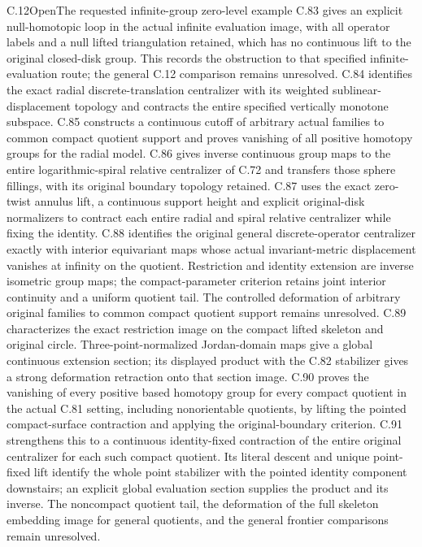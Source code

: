 \begin{claim}{C.12}{Open}{The requested infinite-group zero-level example}
C.83 gives an explicit null-homotopic loop in the actual infinite evaluation image, with all operator labels and a null lifted triangulation retained, which has no continuous lift to the original closed-disk group. This records the obstruction to that specified infinite-evaluation route; the general C.12 comparison remains unresolved.
C.84 identifies the exact radial discrete-translation centralizer with its weighted sublinear-displacement topology and contracts the entire specified vertically monotone subspace. C.85 constructs a continuous cutoff of arbitrary actual families to common compact quotient support and proves vanishing of all positive homotopy groups for the radial model. C.86 gives inverse continuous group maps to the entire logarithmic-spiral relative centralizer of C.72 and transfers those sphere fillings, with its original boundary topology retained. C.87 uses the exact zero-twist annulus lift, a continuous support height and explicit original-disk normalizers to contract each entire radial and spiral relative centralizer while fixing the identity. C.88 identifies the original general discrete-operator centralizer exactly with interior equivariant maps whose actual invariant-metric displacement vanishes at infinity on the quotient. Restriction and identity extension are inverse isometric group maps; the compact-parameter criterion retains joint interior continuity and a uniform quotient tail. The controlled deformation of arbitrary original families to common compact quotient support remains unresolved.
C.89 characterizes the exact restriction image on the compact lifted skeleton and original circle. Three-point-normalized Jordan-domain maps give a global continuous extension section; its displayed product with the C.82 stabilizer gives a strong deformation retraction onto that section image. C.90 proves the vanishing of every positive based homotopy group for every compact quotient in the actual C.81 setting, including nonorientable quotients, by lifting the pointed compact-surface contraction and applying the original-boundary criterion. C.91 strengthens this to a continuous identity-fixed contraction of the entire original centralizer for each such compact quotient. Its literal descent and unique point-fixed lift identify the whole point stabilizer with the pointed identity component downstairs; an explicit global evaluation section supplies the product and its inverse. The noncompact quotient tail, the deformation of the full skeleton embedding image for general quotients, and the general frontier comparisons remain unresolved.


\end{claim}
